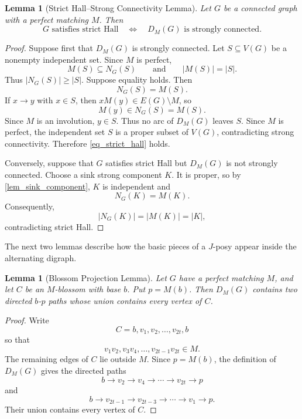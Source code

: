 \documentclass[preprint,12pt]{elsarticle}
\theoremstyle{plain}
\newtheorem{lemma}[theorem]{Lemma}
\begin{document}
\begin{lemma}[Strict Hall--Strong Connectivity Lemma]
\label{lem_strict_hall_strong}
Let \(G\) be a connected graph with a perfect matching \(M\). Then
\begin{equation}\label{eq_strict_hall_strong}
G\text{ satisfies strict Hall}
\quad\Longleftrightarrow\quad
D_M(G)\text{ is strongly connected}.
\end{equation}
\end{lemma}

\begin{proof}
Suppose first that \(D_M(G)\) is strongly connected. Let
\(S\subseteq V(G)\) be a nonempty independent set. Since \(M\) is
perfect,
\[
M(S)\subseteq N_G(S)
\qquad\text{and}\qquad
|M(S)|=|S|.
\]
Thus \(|N_G(S)|\ge |S|\). Suppose equality holds. Then
\[
N_G(S)=M(S).
\]
If \(x\to y\) with \(x\in S\), then
\(xM(y)\in E(G)\setminus M\), so
\[
M(y)\in N_G(S)=M(S).
\]
Since \(M\) is an involution, \(y\in S\). Thus no arc of \(D_M(G)\)
leaves \(S\). Since \(M\) is perfect, the independent set \(S\) is a
proper subset of \(V(G)\), contradicting strong connectivity. Therefore
\cref{eq_strict_hall} holds.

Conversely, suppose that \(G\) satisfies strict Hall but \(D_M(G)\) is
not strongly connected. Choose a sink strong component \(K\). It is
proper, so by \cref{lem_sink_component}, \(K\) is independent and
\[
N_G(K)=M(K).
\]
Consequently,
\[
|N_G(K)|=|M(K)|=|K|,
\]
contradicting strict Hall.
\end{proof}

The next two lemmas describe how the basic pieces of a \(J\)-posy appear
inside the alternating digraph.

\begin{lemma}[Blossom Projection Lemma]\label{lem_blossom_projection}
Let \(G\) have a perfect matching \(M\), and let \(C\) be an
\(M\)-blossom with base \(b\). Put \(p=M(b)\). Then \(D_M(G)\) contains
two directed \(b\)-\(p\) paths whose union contains every vertex of \(C\).
\end{lemma}

\begin{proof}
Write
\[
C=b,v_1,v_2,\ldots,v_{2t},b
\]
so that
\[
v_1v_2,v_3v_4,\ldots,v_{2t-1}v_{2t}\in M.
\]
The remaining edges of \(C\) lie outside \(M\). Since \(p=M(b)\), the
definition of \(D_M(G)\) gives the directed paths
\[
b\to v_2\to v_4\to\cdots\to v_{2t}\to p
\]
and
\[
b\to v_{2t-1}\to v_{2t-3}\to\cdots\to v_1\to p.
\]
Their union contains every vertex of \(C\).
\end{proof}
\end{document}
